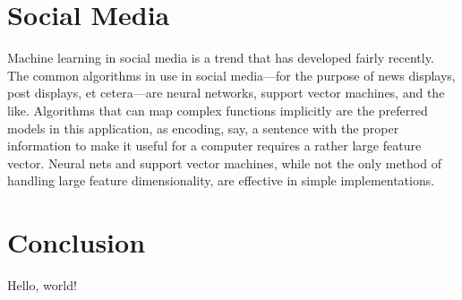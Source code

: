 \documentclass{comjnl}
\numberwithin{equation}{subsection}
\begin{document}
    \section{Social Media}

        Machine learning in social media is a trend that has developed fairly recently. The common
        algorithms in use in social media---for the purpose of news displays, post displays, et
        cetera---are neural networks, support vector machines, and the like. Algorithms that can
        map complex functions implicitly are the preferred models in this application, as encoding,
        say, a sentence with the proper information to make it useful for a computer requires a
        rather large feature vector. Neural nets and support vector machines, while not the only
        method of handling large feature dimensionality, are effective in simple implementations.


    \section{Conclusion}\label{sec:concl}

        Hello, world!


    \nocite{*}
    \printbibliography
\end{document}
